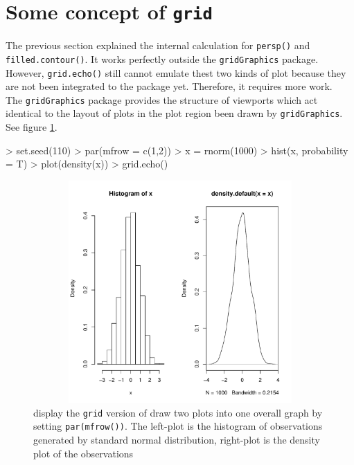 \documentclass[paper=a4, fontsize=11pt]{report}
\begin{document}
\section{Some concept of \texttt{grid}}
The previous section explained the internal calculation for \texttt{persp()} and \texttt{filled.contour()}. It works perfectly outside the \texttt{gridGraphics} package. However, \texttt{grid.echo()} still cannot emulate thest two kinds of plot because they are not been integrated to the package yet. Therefore, it requires more work.\\ 
The \texttt{gridGraphics} package provides the structure of viewports which act identical to the layout of plots in the plot region been drawn by \texttt{gridGraphics}. See figure \ref{figure_4.1}.
\begin{Schunk}
\begin{Sinput}
> set.seed(110)
> par(mfrow = c(1,2))
> x = rnorm(1000)
> hist(x, probability = T)
> plot(density(x))
> grid.echo()
\end{Sinput}
\end{Schunk}
\begin{figure}[h]
\begin{center}
  \includegraphics[height = 8.5cm, width = 15cm]{figure/viewport_demo_1.pdf}
  \caption{display the \texttt{grid} version of draw two plots into one overall graph by setting \texttt{par(mfrow())}. The left-plot is the histogram of observations generated by standard normal distribution, right-plot is the density plot of the observations}
  	\label{figure_4.1}
\end{center}
\end{figure}
\end{document}
